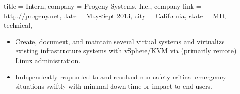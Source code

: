 \begin{position}
  {
    title   = Intern,
    company = {Progeny Systems, Inc.},
    company-link = http://progeny.net,
    date    = May-Sept 2013,
    city    = California,
    state   = MD,
    technical,
  }

\begin{itemize}
\item Create, document, and maintain several virtual systems
  and virtualize existing infrastructure systems with vSphere\slash KVM via (primarily remote) Linux administration.
\item Independently responded to and resolved non-safety-critical emergency situations swiftly
  with minimal down-time or impact to end-users.
\end{itemize}
\end{position}

